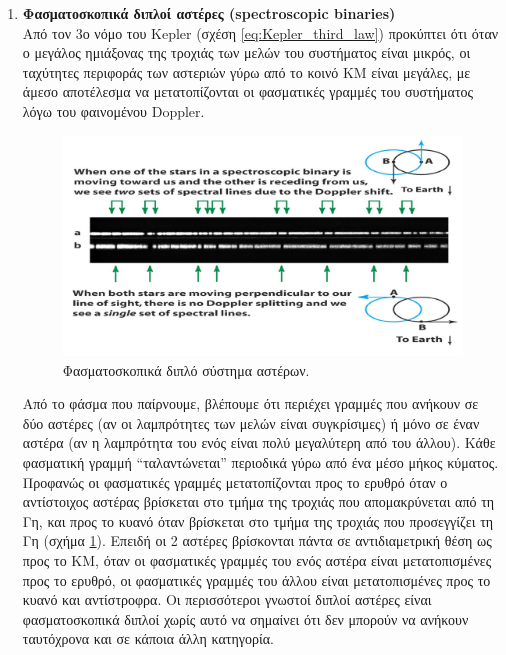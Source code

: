 \begin{enumerate}[label=(\Roman*)]
    \item \textbf{Φασματοσκοπικά διπλοί αστέρες (spectroscopic binaries)} \\
    Από τον 3ο νόμο του Kepler (σχέση \eqref{eq:Kepler_third_law}) προκύπτει ότι όταν ο μεγάλος ημιάξονας της τροχιάς των μελών του συστήματος είναι μικρός, οι ταχύτητες περιφοράς των αστεριών γύρω από το κοινό ΚΜ είναι μεγάλες, με άμεσο αποτέλεσμα να μετατοπίζονται οι φασματικές γραμμές του συστήματος λόγω του φαινομένου Doppler.
        \begin{figure}
            \centering
            \includegraphics[width=\linewidth]{Figures/spectroscopic_binary.png}
            \caption{Φασματοσκοπικά διπλό σύστημα αστέρων.}
            \label{fig:spectroscopic_binary}
        \end{figure}
    Από το φάσμα που παίρνουμε, βλέπουμε ότι περιέχει γραμμές που ανήκουν σε δύο αστέρες (αν οι λαμπρότητες των μελών είναι συγκρίσιμες) ή μόνο σε έναν αστέρα (αν η λαμπρότητα του ενός είναι πολύ μεγαλύτερη από του άλλου). Κάθε φασματική γραμμή ``ταλαντώνεται'' περιοδικά γύρω από ένα μέσο μήκος κύματος. Προφανώς οι φασματικές γραμμές μετατοπίζονται προς το ερυθρό όταν ο αντίστοιχος αστέρας βρίσκεται στο τμήμα της τροχιάς που απομακρύνεται από τη Γη, και προς το κυανό όταν βρίσκεται στο τμήμα της τροχιάς που προσεγγίζει τη Γη (σχήμα \ref{fig:spectroscopic_binary}). Επειδή οι 2 αστέρες βρίσκονται πάντα σε αντιδιαμετρική θέση ως προς το ΚΜ, όταν οι φασματικές γραμμές του ενός αστέρα είναι μετατοπισμένες προς το ερυθρό, οι φασματικές γραμμές του άλλου είναι μετατοπισμένες προς το κυανό και αντίστροφρα. Οι περισσότεροι γνωστοί διπλοί αστέρες είναι φασματοσκοπικά διπλοί χωρίς αυτό να σημαίνει ότι δεν μπορούν να ανήκουν ταυτόχρονα και σε κάποια άλλη κατηγορία.
        

\end{enumerate}
